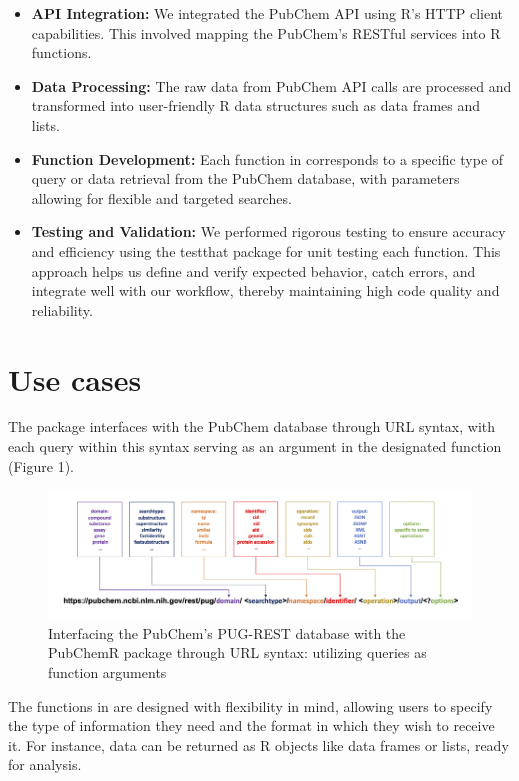 \begin{itemize}
\item
  \textbf{API Integration:} We integrated the PubChem API using R's HTTP client capabilities. This involved mapping the PubChem's RESTful services into R functions.
\item
  \textbf{Data Processing:} The raw data from PubChem API calls are processed and transformed into user-friendly R data structures such as data frames and lists.
\item
  \textbf{Function Development:} Each function in  corresponds to a specific type of query or data retrieval from the PubChem database, with parameters allowing for flexible and targeted searches.
\item
  \textbf{Testing and Validation:} We performed rigorous testing to ensure accuracy and efficiency using the testthat package for unit testing each function. This approach helps us define and verify expected behavior, catch errors, and integrate well with our workflow, thereby maintaining high code quality and reliability.
\end{itemize}

\hypertarget{use-cases}{%
\section{Use cases}\label{use-cases}}

The  package interfaces with the PubChem database through URL syntax, with each query within this syntax serving as an argument in the designated function (Figure 1).

\begin{figure}
\includegraphics[width=1\linewidth,height=0.2\textheight]{figures/Figure_1} \caption{Interfacing the PubChem's PUG-REST database with the PubChemR package through URL syntax: utilizing queries as function arguments}\label{fig:figure1}
\end{figure}

The functions in  are designed with flexibility in mind, allowing users to specify the type of information they need and the format in which they wish to receive it. For instance, data can be returned as R objects like data frames or lists, ready for analysis.

